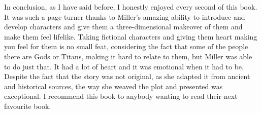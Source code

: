 \documentclass[12pt, a4paper]{article}
\begin{document}
In conclusion, as I have said before, I honestly enjoyed every second of this book. It was such a page-turner thanks to Miller's amazing ability to introduce and develop characters and give them a three-dimensional makeover of them and make them feel lifelike. Taking fictional characters and giving them heart making you feel for them is no small feat, considering the fact that some of the people there are Gods or Titans, making it hard to relate to them, but Miller was able to do just that.  It had a lot of heart and it was emotional when it had to be. Despite the fact that the story was not original, as she adapted it from ancient and historical sources, the way she weaved the plot and presented was exceptional. I recommend this book to anybody wanting to read their next favourite book.

\newpage
\printbibliography
\end{document}
